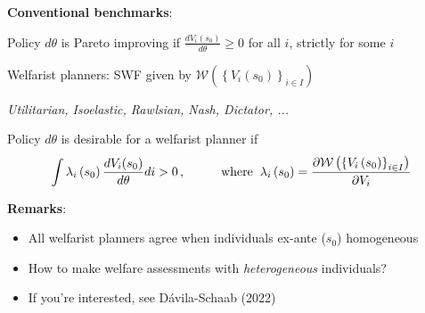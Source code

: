 \documentclass[11pt, aspectratio=169]{beamer}
\begin{document}
\begin{frame}{}
\vspace{4mm}
{\color{myblue} \textbf{Conventional benchmarks}}:
\begin{itemize}
	{\small
		
		\vspace{2mm}
		\item Policy $d \theta$ is {\color{myorange} Pareto improving} if $\frac{ d V_i(s_0) }{d \theta} \geq 0$ for all $i$, strictly for some $i$
		
		\vspace{0mm}
		\item {\color{myorange}Welfarist planners}: \hspace{0.5mm} SWF given by \hspace{0.2mm} $\mathcal{W}\left(\left\{ V_{i}\left(s_{0}\right)\right\} _{i\in I}\right)$
		
		\vspace{0.5mm}
		{\footnotesize \textit{Utilitarian, Isoelastic, Rawlsian, Nash, Dictator, ...}}
		
		\vspace{0mm}
		\item Policy $d \theta$ is desirable for a {\color{myorange} welfarist planner} if
		\vspace*{-1mm}
		\begin{equation*}
			\int \lambda_{i}\left(s_{0}\right) \frac{ d V_i(s_0) }{d \theta} d i > 0 \, , \hspace{10mm}  \text{where} \hspace{2mm} \lambda_{i}\left(s_{0}\right)=\frac{\partial\mathcal{W}\left(\left\{ V_{i}\left(s_{0}\right)\right\} _{i\in I}\right)}{\partial V_{i}}
		\end{equation*}
		}
\end{itemize}

\vspace{6mm}
{\color{navyblue} \textbf{Remarks}}:
{\small
\begin{itemize}
\item All welfarist planners agree when individuals ex-ante ($s_0$) homogeneous

\vspace{-1mm}
\item How to make welfare assessments with \textit{heterogeneous} individuals?

\vspace{-1mm}
\item If you're interested, see D\'avila-Schaab (2022)
\end{itemize}
}
\end{frame}
\end{document}
